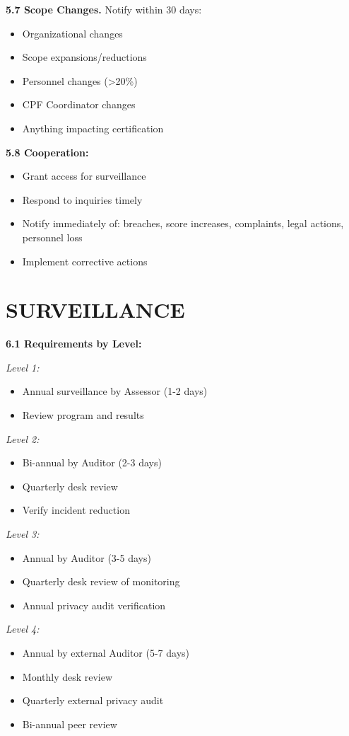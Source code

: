 \documentclass[11pt,a4paper]{article}
\begin{document}
\textbf{5.7 Scope Changes.} Notify within 30 days:
\begin{itemize}
\item Organizational changes
\item Scope expansions/reductions
\item Personnel changes (>20\%)
\item CPF Coordinator changes
\item Anything impacting certification
\end{itemize}

\textbf{5.8 Cooperation:}
\begin{itemize}
\item Grant access for surveillance
\item Respond to inquiries timely
\item Notify immediately of: breaches, score increases, complaints, legal actions, personnel loss
\item Implement corrective actions
\end{itemize}

\section{SURVEILLANCE}

\textbf{6.1 Requirements by Level:}

\textit{Level 1:}
\begin{itemize}
\item Annual surveillance by Assessor (1-2 days)
\item Review program and results
\end{itemize}

\textit{Level 2:}
\begin{itemize}
\item Bi-annual by Auditor (2-3 days)
\item Quarterly desk review
\item Verify incident reduction
\end{itemize}

\textit{Level 3:}
\begin{itemize}
\item Annual by Auditor (3-5 days)
\item Quarterly desk review of monitoring
\item Annual privacy audit verification
\end{itemize}

\textit{Level 4:}
\begin{itemize}
\item Annual by external Auditor (5-7 days)
\item Monthly desk review
\item Quarterly external privacy audit
\item Bi-annual peer review
\end{itemize}
\end{document}
